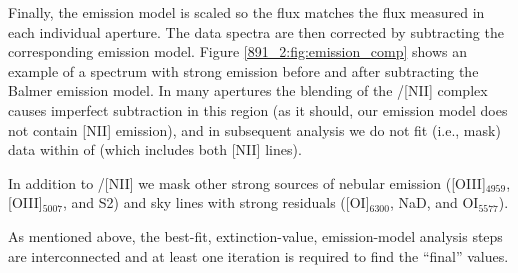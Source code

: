 Finally, the emission model is scaled so the \Ha flux matches the \Ha
flux measured in each individual aperture. The data spectra are then
corrected by subtracting the corresponding emission model. Figure
\ref{891_2:fig:emission_comp} shows an example of a spectrum with strong \HB
emission before and after subtracting the Balmer emission model. In
many apertures the blending of the \Ha/[NII] complex causes imperfect
subtraction in this region (as it should, our emission model does not
contain [NII] emission), and in subsequent analysis we do not fit
(i.e., mask) data within  of \Ha (which includes
both [NII] lines).

In addition to \Ha/[NII] we mask other strong sources of nebular
emission ([OIII]$_{4959}$, [OIII]$_{5007}$, and S2) and sky lines with
strong residuals ([OI]$_{6300}$, NaD, and OI$_{5577}$).


As mentioned above, the best-fit, extinction-value, emission-model
analysis steps are interconnected and at least one iteration is
required to find the ``final'' values.


